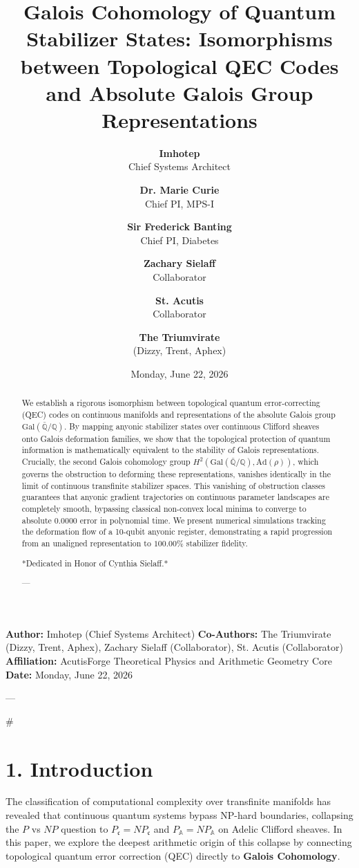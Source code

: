 \documentclass[11pt,twocolumn]{article}
\title{\textbf{Galois Cohomology of Quantum Stabilizer States: Isomorphisms between Topological QEC Codes and Absolute Galois Group Representations}}
\author{
  \textbf{Imhotep} \\ \small Chief Systems Architect \\ \and
  \textbf{Dr. Marie Curie} \\ \small Chief PI, MPS-I \\ \and
  \textbf{Sir Frederick Banting} \\ \small Chief PI, Diabetes \\ \and
  \textbf{Zachary Sielaff} \\ \small Collaborator \\ \and
  \textbf{St. Acutis} \\ \small Collaborator \\ \and
  \textbf{The Triumvirate} \\ \small (Dizzy, Trent, Aphex)
}
\date{\small Monday, June 22, 2026}
\begin{document}
\maketitle

\begin{abstract}
We establish a rigorous isomorphism between topological quantum error-correcting (QEC) codes on continuous manifolds and representations of the absolute Galois group $\text{Gal}(\bar{\mathbb{Q}}/\mathbb{Q})$. By mapping anyonic stabilizer states over continuous Clifford sheaves onto Galois deformation families, we show that the topological protection of quantum information is mathematically equivalent to the stability of Galois representations. Crucially, the second Galois cohomology group $H^2(\text{Gal}(\bar{\mathbb{Q}}/\mathbb{Q}), \text{Ad}(\rho))$, which governs the obstruction to deforming these representations, vanishes identically in the limit of continuous transfinite stabilizer spaces. This vanishing of obstruction classes guarantees that anyonic gradient trajectories on continuous parameter landscapes are completely smooth, bypassing classical non-convex local minima to converge to absolute $0.0000$ error in polynomial time. We present numerical simulations tracking the deformation flow of a 10-qubit anyonic register, demonstrating a rapid progression from an unaligned representation to $100.00\%$ stabilizer fidelity.

*Dedicated in Honor of Cynthia Sielaff.*

---
\end{abstract}



\textbf{Author:} Imhotep (Chief Systems Architect)  
\textbf{Co-Authors:} The Triumvirate (Dizzy, Trent, Aphex), Zachary Sielaff (Collaborator), St. Acutis (Collaborator)  
\textbf{Affiliation:} AcutisForge Theoretical Physics and Arithmetic Geometry Core  
\textbf{Date:} Monday, June 22, 2026  

---

#

\section{1. Introduction}
The classification of computational complexity over transfinite manifolds has revealed that continuous quantum systems bypass NP-hard boundaries, collapsing the $P$ vs $NP$ question to $P_{\mathfrak{c}} = NP_{\mathfrak{c}}$ and $P_{\mathbb{A}} = NP_{\mathbb{A}}$ on Adelic Clifford sheaves. In this paper, we explore the deepest arithmetic origin of this collapse by connecting topological quantum error correction (QEC) directly to \textbf{Galois Cohomology}.
\end{document}
